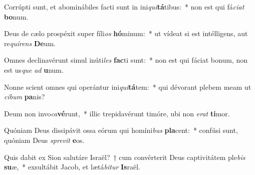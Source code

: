 \item Corrúpti sunt, et abominábiles facti sunt in ini\textit{qui}\textbf{tá}tibus:~* non est qui fá\textit{ci}\textit{at} \textbf{bo}num.
\item Deus de cælo prospéxit super fíli\textit{os} \textbf{hó}minum:~* ut vídeat si est intélligens, aut re\textit{quí}\textit{rens} \textbf{De}um.
\item Omnes declinavérunt simul inúti\textit{les} \textbf{fac}ti sunt:~* non est qui fáciat bonum, non est us\textit{que} \textit{ad} \textbf{u}num.
\item Nonne scient omnes qui operántur ini\textit{qui}\textbf{tá}tem:~* qui dévorant plebem meam ut \textit{ci}\textit{bum} \textbf{pa}nis?
\item Deum non invo\textit{ca}\textbf{vé}runt,~* illic trepidavérunt timóre, ubi non \textit{e}\textit{rat} \textbf{ti}mor.
\item Quóniam Deus dissipávit ossa eórum qui homíni\textit{bus} \textbf{pla}cent:~* confúsi sunt, quóniam Deus \textit{spre}\textit{vit} \textbf{e}os.
\item Quis dabit ex Sion salutáre Israël?~† cum convérterit Deus captivitátem ple\textit{bis} \textbf{su}æ,~* exsultábit Jacob, et lætá\textit{bi}\textit{tur} \textbf{Is}raël.
